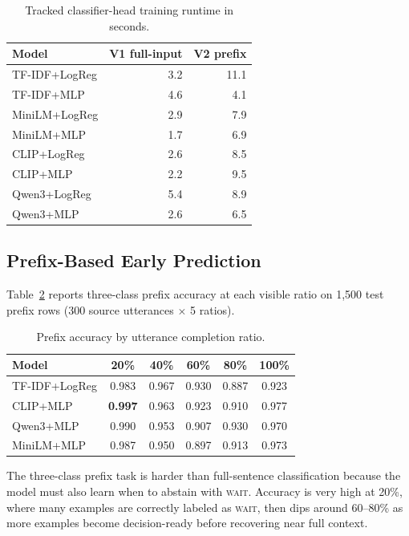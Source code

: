 \documentclass{article}
\begin{document}
\begin{table}[h]
  \centering
  \caption{Tracked classifier-head training runtime in seconds.}
  \label{tab:runtime}
  \small
  \begin{tabular}{lrr}
    \toprule
    Model & V1 full-input & V2 prefix \\
    \midrule
    TF-IDF+LogReg  & 3.2  & 11.1 \\
    TF-IDF+MLP     & 4.6  & 4.1  \\
    MiniLM+LogReg  & 2.9  & 7.9  \\
    MiniLM+MLP     & 1.7  & 6.9  \\
    CLIP+LogReg    & 2.6  & 8.5  \\
    CLIP+MLP       & 2.2  & 9.5  \\
    Qwen3+LogReg   & 5.4  & 8.9  \\
    Qwen3+MLP      & 2.6  & 6.5  \\
    \bottomrule
  \end{tabular}
\end{table}

\subsection{Prefix-Based Early Prediction}

Table~\ref{tab:prefix} reports three-class prefix accuracy at each visible
ratio on 1{,}500 test prefix rows (300 source utterances $\times$ 5 ratios).

\begin{table}[h]
  \centering
  \caption{Prefix accuracy by utterance completion ratio.}
  \label{tab:prefix}
  \begin{tabular}{lccccc}
    \toprule
    Model & 20\% & 40\% & 60\% & 80\% & 100\% \\
    \midrule
    TF-IDF+LogReg    & 0.983 & 0.967 & 0.930 & 0.887 & 0.923 \\
    CLIP+MLP         & \textbf{0.997} & 0.963 & 0.923 & 0.910 & 0.977 \\
    Qwen3+MLP        & 0.990 & 0.953 & 0.907 & 0.930 & 0.970 \\
    MiniLM+MLP       & 0.987 & 0.950 & 0.897 & 0.913 & 0.973 \\
    \bottomrule
  \end{tabular}
\end{table}

The three-class prefix task is harder than full-sentence classification because
the model must also learn when to abstain with \textsc{wait}. Accuracy is very
high at 20\%, where many examples are correctly labeled as \textsc{wait}, then
dips around 60--80\% as more examples become decision-ready before recovering
near full context.
\end{document}
